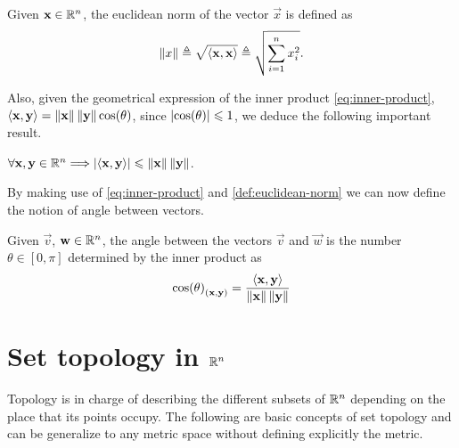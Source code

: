 \begin{defn}\label{def:euclidean-norm}
	Given $\vec{x}\in\Rtn$, the euclidean norm of the vector $\vec{x}$ is defined as
	\begin{equation}
		\left\Vert x \right\Vert\triangleq\sqrt{\langle \mathbf{x}, \mathbf{x} \rangle}\triangleq\sqrt{\sum_{i=1}^n x_i^2}.
	\end{equation}
\end{defn}


Also, given the geometrical expression of the inner product \eqref{eq:inner-product}, $\langle \mathbf{x}, \mathbf{y} \rangle = \left\Vert \mathbf{x} \right\Vert
\left\Vert \mathbf{y} \right\Vert\cos(\theta)$, since $\abs{\cos(\theta)}\leqslant 1$, we deduce the following important result.
\begin{lemma}
$\forall\vec{x}, \vec{y}\in\Rtn \implies \abs{\innerp{\vec{x}, \vec{y}}}\leq \vnorm{\vec{x}}\vnorm{\vec{y}}$.
\end{lemma}


By making use of \ref{eq:inner-product} and \ref{def:euclidean-norm} we can now define the notion of angle between vectors.

\begin{defn}
Given $\vec{v}$, $\vec{w}\in\Rtn$, the angle between the vectors $\vec{v}$ and $\vec{w}$ is the number $\theta\in[0, \pi]$ 
determined by the inner product as
\begin{equation}
\cos(\theta)_{\left(\mathbf{x}, \mathbf{y}\right)} = \frac{\langle \mathbf{x}, \mathbf{y} \rangle}{\left\Vert \mathbf{x} \right\Vert\left\Vert \mathbf{y} \right\Vert}
\end{equation}
\end{defn}



\section{Set topology in $\Rtn$}

Topology is in charge of describing the different subsets of $\Rtn$ depending on the place that its points occupy. The
following are basic concepts of set topology and can be generalize to any metric space without defining explicitly the metric.

